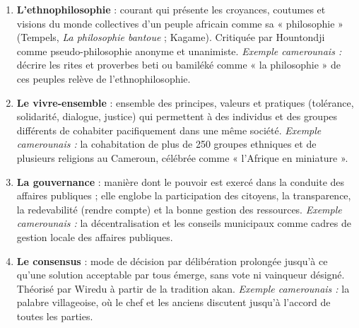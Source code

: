\documentclass[11pt]{article}
\begin{document}
\begin{corrige}
\begin{enumerate}
\item \textbf{L'ethnophilosophie} : courant qui présente les croyances, coutumes et visions du monde collectives d'un peuple africain comme sa « philosophie » (Tempels, \emph{La philosophie bantoue} ; Kagame). Critiquée par Hountondji comme pseudo-philosophie anonyme et unanimiste. \emph{Exemple camerounais :} décrire les rites et proverbes beti ou bamiléké comme « la philosophie » de ces peuples relève de l'ethnophilosophie.
\item \textbf{Le vivre-ensemble} : ensemble des principes, valeurs et pratiques (tolérance, solidarité, dialogue, justice) qui permettent à des individus et des groupes différents de cohabiter pacifiquement dans une même société. \emph{Exemple camerounais :} la cohabitation de plus de 250 groupes ethniques et de plusieurs religions au Cameroun, célébrée comme « l'Afrique en miniature ».
\item \textbf{La gouvernance} : manière dont le pouvoir est exercé dans la conduite des affaires publiques ; elle englobe la participation des citoyens, la transparence, la redevabilité (rendre compte) et la bonne gestion des ressources. \emph{Exemple camerounais :} la décentralisation et les conseils municipaux comme cadres de gestion locale des affaires publiques.
\item \textbf{Le consensus} : mode de décision par délibération prolongée jusqu'à ce qu'une solution acceptable par tous émerge, sans vote ni vainqueur désigné. Théorisé par Wiredu à partir de la tradition akan. \emph{Exemple camerounais :} la palabre villageoise, où le chef et les anciens discutent jusqu'à l'accord de toutes les parties.
\end{enumerate}
\end{corrige}
\end{document}
